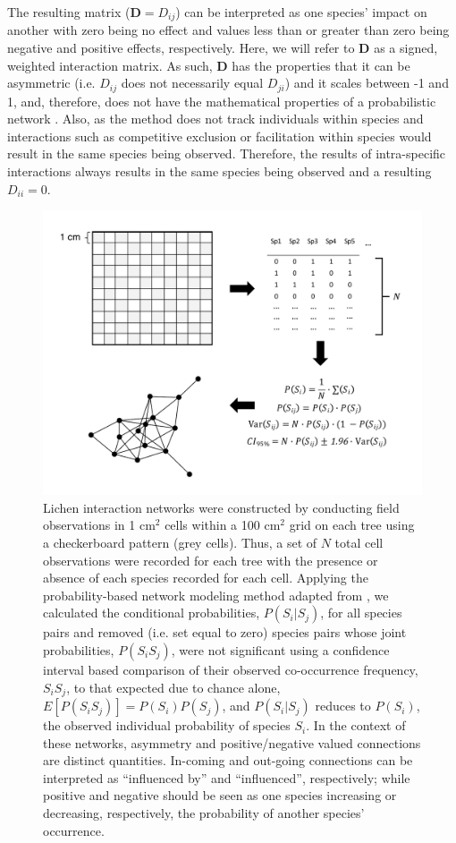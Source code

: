 \documentclass[fleqn,12pt]{olplainarticle}
\begin{document}
The resulting matrix ($\mathbf{D} = D_{ij}$) can be interpreted as one
species' impact on another with zero being no effect and values less
than or greater than zero being negative and positive effects,
respectively. Here, we will refer to $\mathbf{D}$ as a signed,
weighted interaction matrix. As such, $\mathbf{D}$ has the properties
that it can be asymmetric (i.e. $D_{ij}$ does not necessarily equal
$D_{ji}$) and it scales between -1 and 1, and, therefore, does not
have the mathematical properties of a probabilistic network
\cite{Poisot2016TheNetworks}. Also, as the method does not track
individuals within species and interactions such as competitive
exclusion or facilitation within species would result in the same
species being observed. Therefore, the results of intra-specific
interactions always results in the same species being observed and a
resulting $D_{ii} = 0$.

\begin{figure}[ht]
\centering
\includegraphics[width=\linewidth]{lcn_araujo_method.pdf}
\caption{Lichen interaction networks were constructed by conducting
  field observations in 1 cm$^2$ cells within a 100 cm$^2$ grid on each
  tree using a checkerboard pattern (grey cells). Thus, a set of $N$
  total cell observations were recorded for each tree with the
  presence or absence of each species recorded for each cell. Applying
  the probability-based network modeling method adapted from
  \cite{Araujo2011}, we calculated the conditional probabilities,
  $P(S_i|S_j)$, for all species pairs and removed (i.e. set equal to
  zero) species pairs whose joint probabilities, $P(S_i S_j)$, were
  not significant using a confidence interval based comparison of
  their observed co-occurrence frequency, $S_iS_j$, to that expected
  due to chance alone, $E[P(S_iS_j)] = P(S_i) P(S_j)$, and
  $P(S_i|S_j)$ reduces to $P(S_i)$, the observed individual
  probability of species $S_i$. In the context of these networks,
  asymmetry and positive/negative valued connections are distinct
  quantities. In-coming and out-going connections can be interpreted
  as ``influenced by'' and ``influenced'', respectively; while
  positive and negative should be seen as one species increasing or
  decreasing, respectively, the probability of another species'
  occurrence.}
\label{fig:conet_method}
\end{figure}
\end{document}
